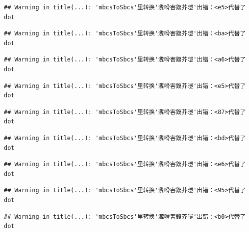 \documentclass[
]{book}
\begin{document}
\begin{verbatim}
## Warning in title(...): 'mbcsToSbcs'里转换'瀵嗗害鍑芥暟'出错：<e5>代替了dot
\end{verbatim}

\begin{verbatim}
## Warning in title(...): 'mbcsToSbcs'里转换'瀵嗗害鍑芥暟'出错：<ba>代替了dot
\end{verbatim}

\begin{verbatim}
## Warning in title(...): 'mbcsToSbcs'里转换'瀵嗗害鍑芥暟'出错：<a6>代替了dot
\end{verbatim}

\begin{verbatim}
## Warning in title(...): 'mbcsToSbcs'里转换'瀵嗗害鍑芥暟'出错：<e5>代替了dot
\end{verbatim}

\begin{verbatim}
## Warning in title(...): 'mbcsToSbcs'里转换'瀵嗗害鍑芥暟'出错：<87>代替了dot
\end{verbatim}

\begin{verbatim}
## Warning in title(...): 'mbcsToSbcs'里转换'瀵嗗害鍑芥暟'出错：<bd>代替了dot
\end{verbatim}

\begin{verbatim}
## Warning in title(...): 'mbcsToSbcs'里转换'瀵嗗害鍑芥暟'出错：<e6>代替了dot
\end{verbatim}

\begin{verbatim}
## Warning in title(...): 'mbcsToSbcs'里转换'瀵嗗害鍑芥暟'出错：<95>代替了dot
\end{verbatim}

\begin{verbatim}
## Warning in title(...): 'mbcsToSbcs'里转换'瀵嗗害鍑芥暟'出错：<b0>代替了dot
\end{verbatim}
\end{document}
